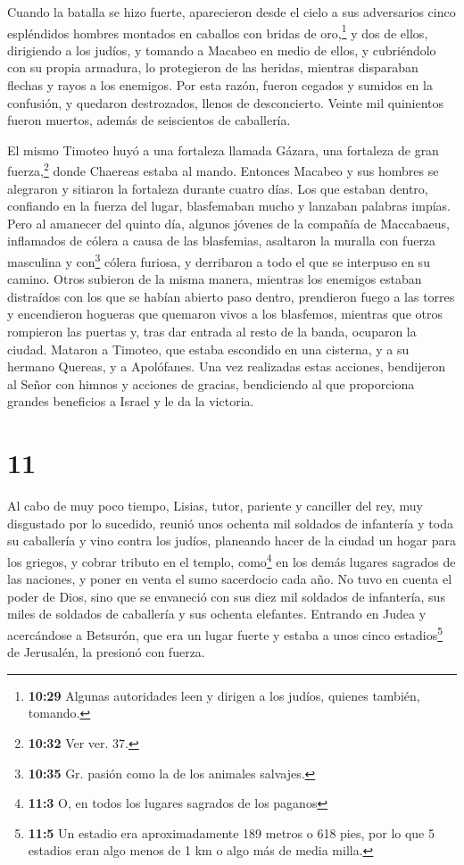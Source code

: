  Cuando la batalla se hizo fuerte, aparecieron desde el
cielo a sus adversarios cinco espléndidos hombres montados en caballos
con bridas de oro,\footnote{\textbf{10:29} Algunas autoridades leen y
  dirigen a los judíos, quienes también, tomando.} y dos de ellos,
dirigiendo a los judíos,  y tomando a Macabeo en medio de
ellos, y cubriéndolo con su propia armadura, lo protegieron de las
heridas, mientras disparaban flechas y rayos a los enemigos. Por esta
razón, fueron cegados y sumidos en la confusión, y quedaron destrozados,
llenos de desconcierto.  Veinte mil quinientos fueron
muertos, además de seiscientos de caballería.

 El mismo Timoteo huyó a una fortaleza llamada Gázara,
una fortaleza de gran fuerza,\footnote{\textbf{10:32} Ver ver. 37.}
donde Chaereas estaba al mando.  Entonces Macabeo y sus
hombres se alegraron y sitiaron la fortaleza durante cuatro días.
 Los que estaban dentro, confiando en la fuerza del
lugar, blasfemaban mucho y lanzaban palabras impías. 
Pero al amanecer del quinto día, algunos jóvenes de la compañía de
Maccabaeus, inflamados de cólera a causa de las blasfemias, asaltaron la
muralla con fuerza masculina y con\footnote{\textbf{10:35} Gr. pasión
  como la de los animales salvajes.} cólera furiosa, y derribaron a todo
el que se interpuso en su camino.  Otros subieron de la
misma manera, mientras los enemigos estaban distraídos con los que se
habían abierto paso dentro, prendieron fuego a las torres y encendieron
hogueras que quemaron vivos a los blasfemos, mientras que otros
rompieron las puertas y, tras dar entrada al resto de la banda, ocuparon
la ciudad.  Mataron a Timoteo, que estaba escondido en
una cisterna, y a su hermano Quereas, y a Apolófanes. 
Una vez realizadas estas acciones, bendijeron al Señor con himnos y
acciones de gracias, bendiciendo al que proporciona grandes beneficios a
Israel y le da la victoria.

\hypertarget{section-10}{%
\section{11}\label{section-10}}

 Al cabo de muy poco tiempo, Lisias, tutor, pariente y
canciller del rey, muy disgustado por lo sucedido,  reunió
unos ochenta mil soldados de infantería y toda su caballería y vino
contra los judíos, planeando hacer de la ciudad un hogar para los
griegos,  y cobrar tributo en el templo, como\footnote{\textbf{11:3}
  O, en todos los lugares sagrados de los paganos} en los demás lugares
sagrados de las naciones, y poner en venta el sumo sacerdocio cada año.
 No tuvo en cuenta el poder de Dios, sino que se envaneció
con sus diez mil soldados de infantería, sus miles de soldados de
caballería y sus ochenta elefantes.  Entrando en Judea y
acercándose a Betsurón, que era un lugar fuerte y estaba a unos cinco
estadios\footnote{\textbf{11:5} Un estadio era aproximadamente 189
  metros o 618 pies, por lo que 5 estadios eran algo menos de 1 km o
  algo más de media milla.} de Jerusalén, la presionó con fuerza.

